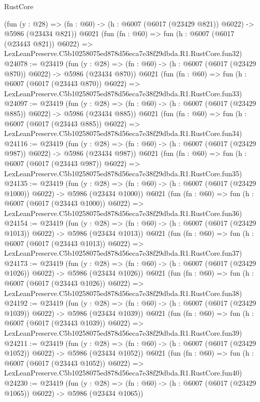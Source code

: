 \begin{lexlean}{RustCore}
\begin{coremodule}
    (fun (y : @28) => (fn : @60) -> (h : @6007 (@6017 (@23429 @821)) @6022) -> @5986 (@23434 @821))
    @6021
    (fun (fn : @60) =>
    fun (h : @6007 (@6017 (@23443 @821)) @6022) =>
    LexLeanPreserve.C5b10258075ed878d56eca7e38f29dbda.R1.RustCore.fun32)
@24078 := @23419
    (fun (y : @28) => (fn : @60) -> (h : @6007 (@6017 (@23429 @870)) @6022) -> @5986 (@23434 @870))
    @6021
    (fun (fn : @60) =>
    fun (h : @6007 (@6017 (@23443 @870)) @6022) =>
    LexLeanPreserve.C5b10258075ed878d56eca7e38f29dbda.R1.RustCore.fun33)
@24097 := @23419
    (fun (y : @28) => (fn : @60) -> (h : @6007 (@6017 (@23429 @885)) @6022) -> @5986 (@23434 @885))
    @6021
    (fun (fn : @60) =>
    fun (h : @6007 (@6017 (@23443 @885)) @6022) =>
    LexLeanPreserve.C5b10258075ed878d56eca7e38f29dbda.R1.RustCore.fun34)
@24116 := @23419
    (fun (y : @28) => (fn : @60) -> (h : @6007 (@6017 (@23429 @987)) @6022) -> @5986 (@23434 @987))
    @6021
    (fun (fn : @60) =>
    fun (h : @6007 (@6017 (@23443 @987)) @6022) =>
    LexLeanPreserve.C5b10258075ed878d56eca7e38f29dbda.R1.RustCore.fun35)
@24135 := @23419
    (fun (y : @28) =>
    (fn : @60) -> (h : @6007 (@6017 (@23429 @1000)) @6022) -> @5986 (@23434 @1000))
    @6021
    (fun (fn : @60) =>
    fun (h : @6007 (@6017 (@23443 @1000)) @6022) =>
    LexLeanPreserve.C5b10258075ed878d56eca7e38f29dbda.R1.RustCore.fun36)
@24154 := @23419
    (fun (y : @28) =>
    (fn : @60) -> (h : @6007 (@6017 (@23429 @1013)) @6022) -> @5986 (@23434 @1013))
    @6021
    (fun (fn : @60) =>
    fun (h : @6007 (@6017 (@23443 @1013)) @6022) =>
    LexLeanPreserve.C5b10258075ed878d56eca7e38f29dbda.R1.RustCore.fun37)
@24173 := @23419
    (fun (y : @28) =>
    (fn : @60) -> (h : @6007 (@6017 (@23429 @1026)) @6022) -> @5986 (@23434 @1026))
    @6021
    (fun (fn : @60) =>
    fun (h : @6007 (@6017 (@23443 @1026)) @6022) =>
    LexLeanPreserve.C5b10258075ed878d56eca7e38f29dbda.R1.RustCore.fun38)
@24192 := @23419
    (fun (y : @28) =>
    (fn : @60) -> (h : @6007 (@6017 (@23429 @1039)) @6022) -> @5986 (@23434 @1039))
    @6021
    (fun (fn : @60) =>
    fun (h : @6007 (@6017 (@23443 @1039)) @6022) =>
    LexLeanPreserve.C5b10258075ed878d56eca7e38f29dbda.R1.RustCore.fun39)
@24211 := @23419
    (fun (y : @28) =>
    (fn : @60) -> (h : @6007 (@6017 (@23429 @1052)) @6022) -> @5986 (@23434 @1052))
    @6021
    (fun (fn : @60) =>
    fun (h : @6007 (@6017 (@23443 @1052)) @6022) =>
    LexLeanPreserve.C5b10258075ed878d56eca7e38f29dbda.R1.RustCore.fun40)
@24230 := @23419
    (fun (y : @28) =>
    (fn : @60) -> (h : @6007 (@6017 (@23429 @1065)) @6022) -> @5986 (@23434 @1065))

\end{coremodule}
\end{lexlean}

